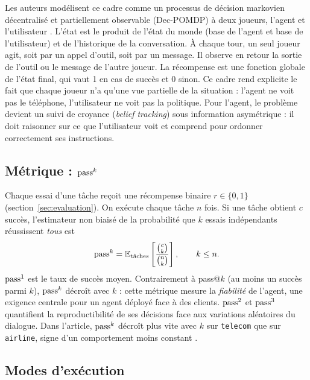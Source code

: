 Les auteurs modélisent ce cadre comme un processus de décision markovien décentralisé et partiellement observable (Dec-POMDP) à deux joueurs, l'agent et l'utilisateur \cite{barres2025tau2}. L'état est le produit de l'état du monde (base de l'agent et base de l'utilisateur) et de l'historique de la conversation. À chaque tour, un seul joueur agit, soit par un appel d'outil, soit par un message. Il observe en retour la sortie de l'outil ou le message de l'autre joueur. La récompense est une fonction globale de l'état final, qui vaut 1 en cas de succès et 0 sinon. Ce cadre rend explicite le fait que chaque joueur n'a qu'une vue partielle de la situation : l'agent ne voit pas le téléphone, l'utilisateur ne voit pas la politique. Pour l'agent, le problème devient un suivi de croyance (\emph{belief tracking}) sous information asymétrique : il doit raisonner sur ce que l'utilisateur voit et comprend pour ordonner correctement ses instructions.

\subsection{Métrique : \texorpdfstring{$\text{pass}^{k}$}{pass\^{}k}}

Chaque essai d'une tâche reçoit une récompense binaire $r \in \{0,1\}$ (section~\ref{sec:evaluation}). On exécute chaque tâche $n$ fois. Si une tâche obtient $c$ succès, l'estimateur non biaisé de la probabilité que $k$ essais indépendants réussissent \emph{tous} est
\begin{equation}
  \text{pass}^{k} = \mathbb{E}_{\text{tâches}}\left[\frac{\binom{c}{k}}{\binom{n}{k}}\right], \qquad k \le n.
\end{equation}
$\text{pass}^{1}$ est le taux de succès moyen. Contrairement à pass@$k$ (au moins un succès parmi $k$), $\text{pass}^{k}$ décroît avec $k$ : cette métrique mesure la \emph{fiabilité} de l'agent, une exigence centrale pour un agent déployé face à des clients. $\text{pass}^{2}$ et $\text{pass}^{3}$ quantifient la reproductibilité de ses décisions face aux variations aléatoires du dialogue. Dans l'article, $\text{pass}^{k}$ décroît plus vite avec $k$ sur \texttt{telecom} que sur \texttt{airline}, signe d'un comportement moins constant \cite{barres2025tau2}.

\subsection{Modes d'exécution}

